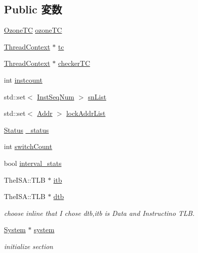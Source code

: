 \subsection*{Public 変数}
\begin{DoxyCompactItemize}
\item 
\hyperlink{classOzoneCPU_1_1OzoneTC}{OzoneTC} \hyperlink{classOzoneCPU_a5daecabb7030478be0d16e7de1eed266}{ozoneTC}
\item 
\hyperlink{classThreadContext}{ThreadContext} $\ast$ \hyperlink{classOzoneCPU_a4455a4759e69e5ebe68ae7298cbcc37d}{tc}
\item 
\hyperlink{classThreadContext}{ThreadContext} $\ast$ \hyperlink{classOzoneCPU_ad1f4c9549fcd6bc1f9da3973e6abd4e5}{checkerTC}
\item 
int \hyperlink{classOzoneCPU_a19e374b98940ff65bd4d9d17f198738c}{instcount}
\item 
std::set$<$ \hyperlink{inst__seq_8hh_a258d93d98edaedee089435c19ea2ea2e}{InstSeqNum} $>$ \hyperlink{classOzoneCPU_a106a511a9cd554b128e50e5ed3bb601f}{snList}
\item 
std::set$<$ \hyperlink{base_2types_8hh_af1bb03d6a4ee096394a6749f0a169232}{Addr} $>$ \hyperlink{classOzoneCPU_a286f0c8474a26561e538e1c80bcfcacd}{lockAddrList}
\item 
\hyperlink{classOzoneCPU_a67a0db04d321a74b7e7fcfd3f1a3f70b}{Status} \hyperlink{classOzoneCPU_a6cdf6e6db875a442f3ab6db542bd2bb5}{\_\-status}
\item 
int \hyperlink{classOzoneCPU_a823cf9753f27fd4c4fcca316a570c304}{switchCount}
\item 
bool \hyperlink{classOzoneCPU_a60dc78ede18ae1c296442fd0d1cde61b}{interval\_\-stats}
\item 
TheISA::TLB $\ast$ \hyperlink{classOzoneCPU_abcb37ddc11515555d8484702697bc4bb}{itb}
\item 
TheISA::TLB $\ast$ \hyperlink{classOzoneCPU_ad2fd039621f87592c4b344d4f8948e78}{dtb}
\begin{DoxyCompactList}\small\item\em choose inline that I chose dtb,itb is Data and Instructino TLB. \item\end{DoxyCompactList}\item 
\hyperlink{classSystem}{System} $\ast$ \hyperlink{classOzoneCPU_af27ccd765f13a4b7bd119dc7579e2746}{system}
\begin{DoxyCompactList}\small\item\em initialize section \item\end{DoxyCompactList}\item 

\end{DoxyCompactItemize}
